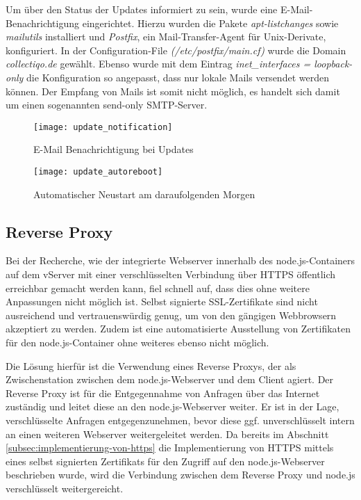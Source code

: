 Um über den Status der Updates informiert zu sein, wurde eine E-Mail-Benachrichtigung eingerichtet.
Hierzu wurden die Pakete \textit{apt-listchanges} sowie \textit{mailutils} installiert und \textit{Postfix}, ein Mail-Transfer-Agent für Unix-Derivate, konfiguriert.
In der Configuration-File \textit{(/etc/postfix/main.cf)} wurde die Domain \textit{collectiqo.de} gewählt.
Ebenso wurde mit dem Eintrag \textit{inet\_interfaces = loopback-only} die Konfiguration so angepasst, dass nur lokale Mails versendet werden können.
Der Empfang von Mails ist somit nicht möglich, es handelt sich damit um einen sogenannten send-only SMTP-Server.

\begin{figure}[h]
    \centering
    \texttt{[image: update\_notification]}
    \caption{E-Mail Benachrichtigung bei Updates}
    \label{fig:update_notification}
\end{figure}

\begin{figure}[h]
    \centering
    \texttt{[image: update\_autoreboot]}
    \caption{Automatischer Neustart am daraufolgenden Morgen}
    \label{fig:update_autoreboot}
\end{figure}

\subsection{Reverse Proxy}\label{subsubsec:reverse-proxy}

Bei der Recherche, wie der integrierte Webserver innerhalb des node.js-Containers auf dem vServer mit einer verschlüsselten Verbindung über HTTPS öffentlich erreichbar gemacht werden kann, fiel schnell auf, dass dies ohne weitere Anpassungen nicht möglich ist.
Selbst signierte SSL-Zertifikate sind nicht ausreichend und vertrauenswürdig genug, um von den gängigen Webbrowsern akzeptiert zu werden.
Zudem ist eine automatisierte Ausstellung von Zertifikaten für den node.js-Container ohne weiteres ebenso nicht möglich.

Die Lösung hierfür ist die Verwendung eines Reverse Proxys, der als Zwischenstation zwischen dem node.js-Webserver und dem Client agiert.
Der Reverse Proxy ist für die Entgegennahme von Anfragen über das Internet zuständig und leitet diese an den node.js-Webserver weiter.
Er ist in der Lage, verschlüsselte Anfragen entgegenzunehmen, bevor diese ggf. unverschlüsselt intern an einen weiteren Webserver weitergeleitet werden.
Da bereits im Abschnitt \ref{subsec:implementierung-von-https} die Implementierung von HTTPS mittels eines selbst signierten Zertifikats für den Zugriff auf den node.js-Webserver beschrieben wurde, wird die Verbindung zwischen dem Reverse Proxy und node.js verschlüsselt weitergereicht.

